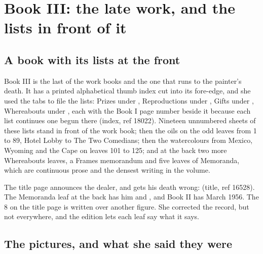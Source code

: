 \chapter{Book III: the late work, and the lists in front of it}

\section{A book with its lists at the front}

Book III is the last of the work books and the one that runs to the painter's death. It has a printed alphabetical thumb index cut into its fore-edge, and she used the tabs to file the lists: Prizes under , Reproductions under , Gifts under , Whereabouts under , each with the Book I page number beside it because each list continues one begun there (index, ref 18022). Nineteen unnumbered sheets of these lists stand in front of the work book; then the oils on the odd leaves from 1 to 89, Hotel Lobby to The Two Comedians; then the watercolours from Mexico, Wyoming and the Cape on leaves 101 to 125; and at the back two more Whereabouts leaves, a Frames memorandum and five leaves of Memoranda, which are continuous prose and the densest writing in the volume.

The title page announces the dealer, and gets his death wrong:  (title, ref 16528). The Memoranda leaf at the back has him  and , and Book II has March 1956. The 8 on the title page is written over another figure. She corrected the record, but not everywhere, and the edition lets each leaf say what it says.

\section{The pictures, and what she said they were}

